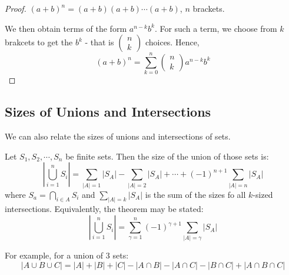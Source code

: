\documentclass[../Main.tex]{subfiles}
\begin{document}
\begin{proof}
    $(a + b)^n = (a + b)(a + b) \cdots (a + b)$, $n$ brackets.\par
    We then obtain terms of the form $a^{n-k} b^k$. For such a term, we choose from $k$ brakcets to get the $b^k$ - that is $\begin{pmatrix}n \\ k\end{pmatrix}$ choices. Hence,
    \begin{equation}
        (a + b)^n = \sum_{k=0}^{n} \begin{pmatrix}n \\ k\end{pmatrix} a^{n-k}{b^k}
    \end{equation}
\end{proof}
\subsection{Sizes of Unions and Intersections}
We can also relate the sizes of unions and intersections of sets.
\begin{theorem}
    Let $S_1, S_2, \cdots, S_n$ be finite sets. Then the size of the union of those sets is:
    \begin{equation*}
        \left|\bigcup_{i=1}^n S_i\right| = \sum_{|A|=1} |S_A| - \sum_{|A| = 2} |S_A| + \cdots + (-1)^{n+1} \sum_{|A| = n} |S_A|
    \end{equation*}
    where $S_a = \bigcap_{i \in A} S_i$ and $\sum_{|A| = k} |S_A|$ is the sum of the sizes fo all $k$-sized intersections. Equivalently, the theorem may be stated:
    \begin{equation*}
        \left|\bigcup_{i=1}^n S_i\right| = \sum_{\gamma = 1}^{n} (-1)^{\gamma + 1} \sum_{|A| = \gamma} |S_A|
    \end{equation*}
\end{theorem}
For example, for a union of 3 sets:
\begin{equation*}
    |A \cup B \cup C| = |A| + |B| + |C| - |A \cap B| - |A \cap C| - |B \cap C| + |A \cap B \cap C|
\end{equation*}
\end{document}
